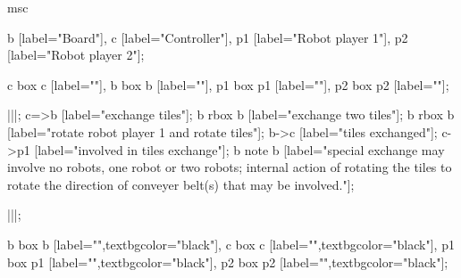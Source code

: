 \begin{msc}
msc
{

b [label="Board"],
c [label="Controller"],
p1 [label="Robot player 1"],
p2 [label="Robot player 2"];

c box c [label=""],
b box b [label=""],
p1 box p1 [label=""],
p2 box p2 [label=""];

|||;
c=>b [label="exchange tiles"];
b rbox b [label="exchange two tiles"];
b rbox b [label="rotate robot player 1 and rotate tiles"];
b->c [label="tiles exchanged"];
c->p1 [label="involved in tiles exchange"];
b note b [label="special exchange may involve no robots, one robot or two robots; internal action of rotating the tiles to rotate the direction of conveyer belt(s) that may be involved."];

|||;

b box b [label="",textbgcolor="black"],
c box c [label="",textbgcolor="black"],
p1 box p1 [label="",textbgcolor="black"],
p2 box p2 [label="",textbgcolor="black"];

}
\end{msc}
